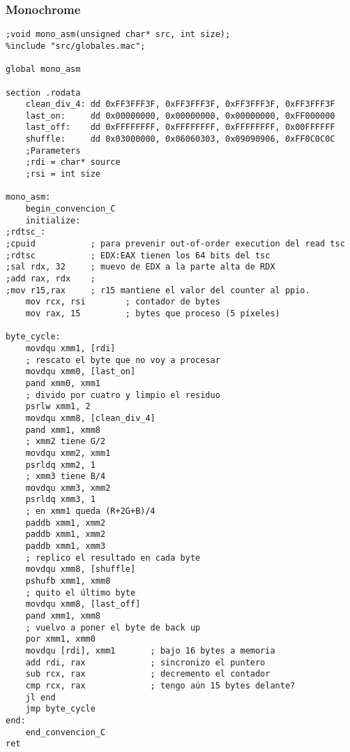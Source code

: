 \subsubsection{Monochrome}
\begin{verbatim}
;void mono_asm(unsigned char* src, int size);
%include "src/globales.mac";

global mono_asm

section .rodata
    clean_div_4: dd 0xFF3FFF3F, 0xFF3FFF3F, 0xFF3FFF3F, 0xFF3FFF3F
    last_on:     dd 0x00000000, 0x00000000, 0x00000000, 0xFF000000
    last_off:    dd 0xFFFFFFFF, 0xFFFFFFFF, 0xFFFFFFFF, 0x00FFFFFF
    shuffle:     dd 0x03000000, 0x06060303, 0x09090906, 0xFF0C0C0C
    ;Parameters
    ;rdi = char* source
    ;rsi = int size

mono_asm:
    begin_convencion_C
    initialize:
;rdtsc_:
;cpuid           ; para prevenir out-of-order execution del read tsc
;rdtsc           ; EDX:EAX tienen los 64 bits del tsc
;sal rdx, 32     ; muevo de EDX a la parte alta de RDX
;add rax, rdx    ; 
;mov r15,rax     ; r15 mantiene el valor del counter al ppio.
    mov rcx, rsi        ; contador de bytes
    mov rax, 15         ; bytes que proceso (5 píxeles)

byte_cycle:
    movdqu xmm1, [rdi]
    ; rescato el byte que no voy a procesar
    movdqu xmm0, [last_on]
    pand xmm0, xmm1
    ; divido por cuatro y limpio el residuo
	psrlw xmm1, 2
    movdqu xmm8, [clean_div_4]
    pand xmm1, xmm8
	; xmm2 tiene G/2
    movdqu xmm2, xmm1
    psrldq xmm2, 1
	; xmm3 tiene B/4
    movdqu xmm3, xmm2
    psrldq xmm3, 1
	; en xmm1 queda (R+2G+B)/4
    paddb xmm1, xmm2
    paddb xmm1, xmm2
    paddb xmm1, xmm3
    ; replico el resultado en cada byte
    movdqu xmm8, [shuffle]
    pshufb xmm1, xmm8
    ; quito el último byte
    movdqu xmm8, [last_off]
    pand xmm1, xmm8
    ; vuelvo a poner el byte de back up
    por xmm1, xmm0
    movdqu [rdi], xmm1       ; bajo 16 bytes a memoria
    add rdi, rax             ; sincronizo el puntero
    sub rcx, rax             ; decremento el contador
    cmp rcx, rax             ; tengo aún 15 bytes delante?
    jl end
    jmp byte_cycle
end:
    end_convencion_C
ret

\end{verbatim}
